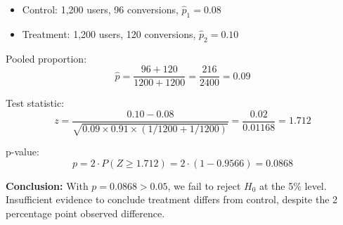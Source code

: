 \begin{example}
\begin{itemize}
    \item Control: 1,200 users, 96 conversions, $\hat{p}_1 = 0.08$
    \item Treatment: 1,200 users, 120 conversions, $\hat{p}_2 = 0.10$
\end{itemize}

Pooled proportion:
\begin{equation}
\hat{p} = \frac{96 + 120}{1200 + 1200} = \frac{216}{2400} = 0.09
\end{equation}

Test statistic:
\begin{equation}
z = \frac{0.10 - 0.08}{\sqrt{0.09 \times 0.91 \times (1/1200 + 1/1200)}} = \frac{0.02}{0.01168} = 1.712
\end{equation}

p-value:
\begin{equation}
p = 2 \cdot P(Z \geq 1.712) = 2 \cdot (1 - 0.9566) = 0.0868
\end{equation}

\textbf{Conclusion:} With $p = 0.0868 > 0.05$, we fail to reject $H_0$ at the 5\% level. Insufficient evidence to conclude treatment differs from control, despite the 2 percentage point observed difference.
\end{example}

